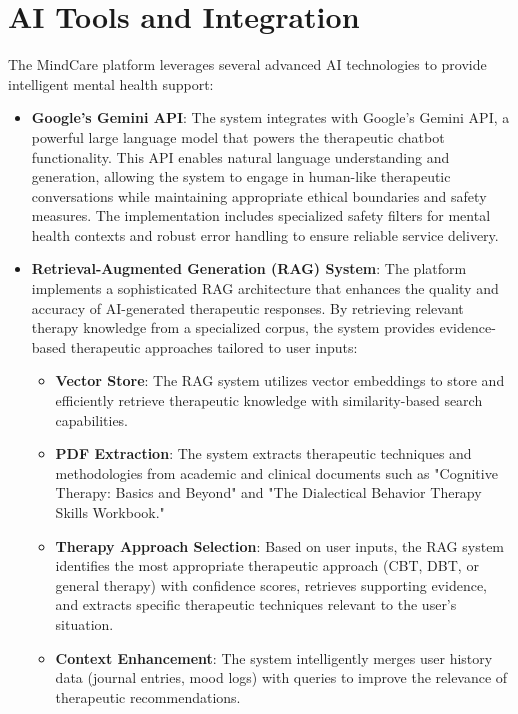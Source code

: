 \section{AI Tools and Integration}

The MindCare platform leverages several advanced AI technologies to provide intelligent mental health support:

\begin{itemize}
  \item \textbf{Google's Gemini API}: The system integrates with Google's Gemini API, a powerful large language model that powers the therapeutic chatbot functionality. This API enables natural language understanding and generation, allowing the system to engage in human-like therapeutic conversations while maintaining appropriate ethical boundaries and safety measures. The implementation includes specialized safety filters for mental health contexts and robust error handling to ensure reliable service delivery.
  
  \item \textbf{Retrieval-Augmented Generation (RAG) System}: The platform implements a sophisticated RAG architecture that enhances the quality and accuracy of AI-generated therapeutic responses. By retrieving relevant therapy knowledge from a specialized corpus, the system provides evidence-based therapeutic approaches tailored to user inputs:
    \begin{itemize}
      \item \textbf{Vector Store}: The RAG system utilizes vector embeddings to store and efficiently retrieve therapeutic knowledge with similarity-based search capabilities.
      \item \textbf{PDF Extraction}: The system extracts therapeutic techniques and methodologies from academic and clinical documents such as "Cognitive Therapy: Basics and Beyond" and "The Dialectical Behavior Therapy Skills Workbook."
      \item \textbf{Therapy Approach Selection}: Based on user inputs, the RAG system identifies the most appropriate therapeutic approach (CBT, DBT, or general therapy) with confidence scores, retrieves supporting evidence, and extracts specific therapeutic techniques relevant to the user's situation.
      \item \textbf{Context Enhancement}: The system intelligently merges user history data (journal entries, mood logs) with queries to improve the relevance of therapeutic recommendations.
    \end{itemize}
  

\end{itemize}
